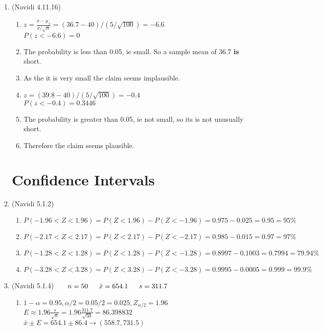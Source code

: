 \documentclass[11pt]{article}
\begin{document}
\begin{preview}
\begin{enumerate}
\begin{enumerate}
\end{enumerate}

\item (Navidi 4.11.16)  
\begin{enumerate}
        \item $z = \frac{\bar{x}-\mu_{\bar{x}}}{\sigma / \sqrt{n}} = (36.7 - 40)/(5/ \sqrt{100})=-6.6$ \\
        $P(z < -6.6) = 0$
        \item The probability is less than 0.05, ie small. So a sample mean of 36.7 \textbf{is} short.
        \item As the it is very small the claim seems implausible.
        \item $z = (39.8 - 40)/(5/ \sqrt{100})=-0.4$ \\
        $P(z < -0.4) = 0.3446$
        \item The probability is greater than 0.05, ie not small, so its is not unusually short. 
        \item Therefore the claim seems plausible.
\end{enumerate}

\section*{Confidence Intervals}
\item (Navidi 5.1.2)
\begin{enumerate}
        \item $P(-1.96 < Z < 1.96) = P(Z < 1.96) - P(Z < -1.96) = 0.975 - 0.025 = 0.95 = 95\%$
        \item $P(-2.17 < Z < 2.17) = P(Z < 2.17) - P(Z < -2.17) = 0.985 - 0.015 = 0.97 = 97\%$
        \item $P(-1.28< Z < 1.28) = P(Z < 1.28) - P(Z < -1.28) = 0.8997 - 0.1003=0.7994 = 79.94\%$
        \item $P(-3.28 < Z < 3.28) = P(Z < 3.28) - P(Z < -3.28) = 0.9995 - 0.0005 = 0.999 = 99.9\%$
\end{enumerate}

\item (Navidi 5.1.4) $\hspace{16pt} n=50 \hspace*{16pt} \bar{x} = 654.1 \hspace*{16pt} s = 311.7$
\begin{enumerate}
        \item $1-\alpha = 0.95, \alpha / 2 = 0.05/2=0.025, Z_{\alpha/2} = 1.96$ \\
        $E \approx 1.96\frac{s}{\sqrt{n}} = 1.96\frac{311.7}{\sqrt{50}}=86.398832$ \\
        $\bar{x}\pm E = 654.1\pm86.4 \rightarrow (558.7,731.5)$


\end{enumerate}
\end{enumerate}
\end{preview}
\end{document}

